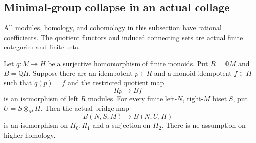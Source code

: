 \subsection{Minimal-group collapse in an actual collage}

All modules, homology, and cohomology in this subsection have rational
coefficients.  The quotient functors and induced connecting sets are actual
finite categories and finite sets.

\begin{lemma}
\label{CP2:A-averaged-column-bridge-connectivity}
Let $q:M\twoheadrightarrow H$ be a surjective homomorphism of finite
monoids.  Put $R=\mathbb QM$ and $B=\mathbb QH$.  Suppose there are an
idempotent $p\in R$ and a monoid idempotent $f\in H$ such that
$q(p)=f$ and the restricted quotient map
\[
 Rp\longrightarrow Bf
                                                               \tag{1}
\]
is an isomorphism of left $R$ modules.  For every finite left-$N$,
right-$M$ biset $S$, put $U=S\otimes_M H$.  Then the actual bridge map
\[
 B(N,S,M)\longrightarrow B(N,U,H)
                                                               \tag{2}
\]
is an isomorphism on $H_0,H_1$ and a surjection on $H_2$.
There is no assumption on higher homology.
\end{lemma}
